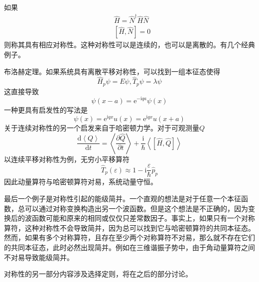 \documentclass[12pt, a4paper, oneside]{ctexart}
\begin{document}
	\quad\quad 如果
	\begin{align}
		&\hat{H}=\hat{N}^{\dagger}\hat{H}\hat{N}\\
		&\left[\hat{H},\hat{N}\right]=0
	\end{align}
	\quad\quad 则称其具有相应对称性。这种对称性可以是连续的，也可以是离散的。有几个经典例子。\par 
	布洛赫定理。如果系统具有离散平移对称性，可以找到一组本征态使得
	\begin{equation}
		\hat{H}_{p}\psi=E\psi,\hat{T}_{p}\psi=\lambda\psi
	\end{equation}
	\quad\quad 这直接导致
	\begin{equation}
		\psi(x-a)=\mathrm{e}^{-\mathrm{i}qa}\psi(x)
	\end{equation}
	\quad\quad 一种更具有启发性的写法是
	\begin{equation}
		\psi(x)=\mathrm{e}^{\mathrm{i}qx}u(x)=\mathrm{e}^{\mathrm{i}qx}u(x+a)
	\end{equation}
	\quad\quad 关于连续对称性的另一个启发来自于哈密顿力学。对于可观测量$Q$
	\begin{equation}
		\dfrac{\mathrm{d}\left<Q\right>}{\mathrm{d}t}=\left<\dfrac{\partial\hat{Q}}{\partial t}\right>+\dfrac{\mathrm{i}}{\hbar}\left<\left[\hat{H},\hat{Q}\right]\right>
	\end{equation}
	\quad\quad 以连续平移对称性为例，无穷小平移算符
	\begin{equation}
		\hat{T}_{p}(\varepsilon)\approx1-\mathrm{i}\dfrac{\varepsilon}{\hbar}\hat{p}_{p}
	\end{equation}
	\quad\quad 因此动量算符与哈密顿算符对易，系统动量守恒。\par 
	最后一个例子是对称性引起的能级简并。一个直观的想法是对于任意一个本征函数，总可以通过对称变换构造出另一个波函数。但是这个想法是不正确的，因为变换后的波函数可能和原来的相同或仅仅只差常数因子。事实上，如果只有一个对称算符，这种对称性不会导致简并，因为总可以找到它与哈密顿算符的共同本征态。然而，如果有多个对称算符，且存在至少两个对称算符不对易，那么就不存在它们的共同本征态，此时必然出现简并。例如在三维谐振子势中，由于角动量算符之间不对易导致能级简并。\par 
	对称性的另一部分内容涉及选择定则，将在之后的部分讨论。
\end{document}
